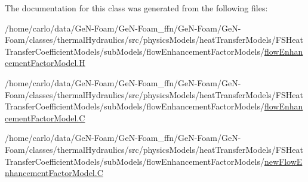 The documentation for this class was generated from the following files\+:\begin{DoxyCompactItemize}
\item 
/home/carlo/data/\+Ge\+N-\/\+Foam/\+Ge\+N-\/\+Foam\+\_\+ffn/\+Ge\+N-\/\+Foam/\+Ge\+N-\/\+Foam/classes/thermal\+Hydraulics/src/physics\+Models/heat\+Transfer\+Models/\+F\+S\+Heat\+Transfer\+Coefficient\+Models/sub\+Models/flow\+Enhancement\+Factor\+Models/\hyperlink{flowEnhancementFactorModel_8H}{flow\+Enhancement\+Factor\+Model.\+H}\item 
/home/carlo/data/\+Ge\+N-\/\+Foam/\+Ge\+N-\/\+Foam\+\_\+ffn/\+Ge\+N-\/\+Foam/\+Ge\+N-\/\+Foam/classes/thermal\+Hydraulics/src/physics\+Models/heat\+Transfer\+Models/\+F\+S\+Heat\+Transfer\+Coefficient\+Models/sub\+Models/flow\+Enhancement\+Factor\+Models/\hyperlink{flowEnhancementFactorModel_8C}{flow\+Enhancement\+Factor\+Model.\+C}\item 
/home/carlo/data/\+Ge\+N-\/\+Foam/\+Ge\+N-\/\+Foam\+\_\+ffn/\+Ge\+N-\/\+Foam/\+Ge\+N-\/\+Foam/classes/thermal\+Hydraulics/src/physics\+Models/heat\+Transfer\+Models/\+F\+S\+Heat\+Transfer\+Coefficient\+Models/sub\+Models/flow\+Enhancement\+Factor\+Models/\hyperlink{newFlowEnhancementFactorModel_8C}{new\+Flow\+Enhancement\+Factor\+Model.\+C}\end{DoxyCompactItemize}
